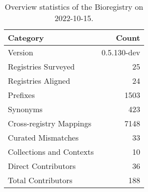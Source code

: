 \begin{table}
\centering
\caption{Overview statistics of the Bioregistry on 2022-10-15.}
\label{tab:bioregistry-summary}
\begin{tabular}{lr}
\toprule
                Category &       Count \\
\midrule
                 Version & 0.5.130-dev \\
     Registries Surveyed &          25 \\
      Registries Aligned &          24 \\
                Prefixes &        1503 \\
                Synonyms &         423 \\
 Cross-registry Mappings &        7148 \\
      Curated Mismatches &          33 \\
Collections and Contexts &          10 \\
     Direct Contributors &          36 \\
      Total Contributors &         188 \\
\bottomrule
\end{tabular}
\end{table}

